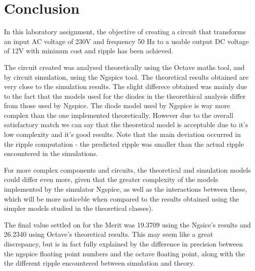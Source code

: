 \section{Conclusion}
\label{sec:conclusion}

In this laboratory assignment, the objective of creating a circuit that transforms an input AC voltage of 230V and frequency 50 Hz to a usable output DC voltage of 12V with minimun cost and ripple has been achieved.\par
The circuit created was analysed theoretically using the Octave maths tool, and by circuit simulation, using the
Ngspice tool. The theoretical results obtained are very close to the simulation results. The slight differece obtained was mainly due to the fact that the models used for the diodes in the theorethical analysis differ from those used by Ngspice. The diode model used by Ngspice is way more complex than the one implemented theoretically. However due to the overall satisfactory match we can say that the theoretical model is acceptable due to it's low complexity and it's good results. Note that the main deviation occurred in the ripple computation - the predicted ripple was smaller than the actual ripple encountered in the simulations.\par
 For more complex components and circuits, the
theoretical and simulation models could differ even more, given that the greater complexity of the models implemented by the simulator Ngspice, as well as the interactions between these, which will be more noticeble when compared to the results obtained using the simpler models studied in the theoretical classes).\par
The final value settled on for the Merit was 19.3709 using the Ngsice's results and 26.2340 using Octave's theoretical results. This may seem like a great discrepancy, but is in fact fully explained by the difference in precision between the ngspice floating point numbers and the octave floating point, along with the the different ripple encountered between simulation and theory.

